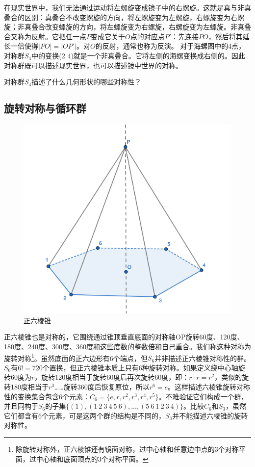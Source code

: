 \documentclass[b5paper]{ctexart}
\begin{document}
在现实世界中，我们无法通过运动将左螺旋变成镜子中的右螺旋。这就是真与非真叠合的区别：真叠合不改变螺旋的方向，将左螺旋变为左螺旋，右螺旋变为右螺旋；非真叠合改变螺旋的方向，将左螺旋变为右螺旋，右螺旋变为左螺旋。非真叠合又称为反射\cite{Weyl1952}。它把任一点$P$变成它关于$O$点的对应点$P'$：先连接$PO$，然后将其延长一倍使得$|PO| = |OP'|$。对$O$的反射，通常也称为反演。
对于海螺图中的4点，对称群$S_4$中的变换(2 4)就是一个非真叠合。它将左侧的海螺变换成右侧的。因此对称群既可以描述现实世界，也可以描述镜中世界的对称。

\begin{Exercise}
对称群$S_4$描述了什么几何形状的哪些对称性？
\end{Exercise}

\subsection{旋转对称与循环群}

\begin{figure}[htbp]
 \centering
 \includegraphics[scale=0.8]{img/hexagonal-pyramid.png}
 \caption{正六棱锥}
 \label{fig:regular-hexagonal-pyramid}
\end{figure}

正六棱锥也是对称的，它围绕通过锥顶垂直底面的对称轴OP旋转60度、120度、180度、240度、300度、360度和这些度数的整数倍和自己重合。我们称这种对称为旋转对称\footnote{除旋转对称外，正六棱锥还有镜面对称，过中心轴和任意边中点的3个对称平面，过中心轴和底面顶点的3个对称平面。}。虽然底面的正六边形有6个端点，但$S_6$并非描述正六棱锥对称性的群。$S_6$有$6! = 720$个置换，但正六棱锥本质上只有6种旋转对称。如果定义绕中心轴旋转60度为$r$，旋转120度相当于旋转60度后再次旋转60度，即：$r \cdot r = r^2$，类似的旋转180度相当于$r^3$……旋转360度后恢复原位，所以$r^6 = e$。这样描述六棱锥旋转对称性的变换集合包含6个元素：$C_6 = \{e, r, r^2, r^3, r^4, r^5\}$。不难验证它们构成一个群，并且同构于$S_6$的子集$\{(1), (1\ 2\ 3\ 4\ 5\ 6), ..., (5\ 6\ 1\ 2\ 3\ 4)\}$。比较$C_6$和$S_3$，虽然它们都含有6个元素，可是这两个群的结构是不同的，$S_3$并不能描述六棱锥的旋转对称性。
\end{document}
